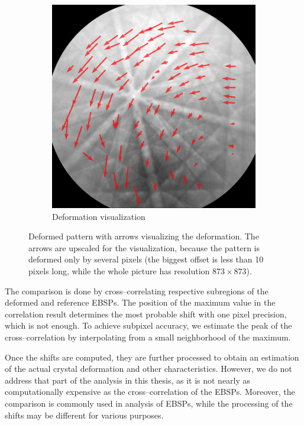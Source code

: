 \begin{figure}
\begin{subfigure}{.4\textwidth}
	\end{subfigure}
	\centering
	\begin{subfigure}{.4\textwidth}
		\centering
		\includegraphics[width=.9\linewidth]{img/roi_shifts}
		\caption{Deformation visualization}
		\label{roi-shifts:result}
	\end{subfigure}

	\caption{Deformed pattern with arrows visualizing the deformation. The arrows are upscaled for the visualization, because the pattern is deformed only by several pixels (the biggest offset is less than 10 pixels long, while the whole picture has resolution $873 \times 873$).}
	\label{roi-shifts}
\end{figure}

The comparison is done by cross--correlating respective subregions of the deformed and reference EBSPs. The position of the maximum value in the correlation result determines the most probable shift with one pixel precision, which is not enough. To achieve subpixel accuracy, we estimate the peak of the cross--correlation by interpolating from a small neighborhood of the maximum.

Once the shifts are computed, they are further processed to obtain an estimation of the actual crystal deformation and other characteristics. However, we do not address that part of the analysis in this thesis, as it is not nearly as computationally expensive as the cross--correlation of the EBSPs. Moreover, the comparison is commonly used in analysis of EBSPs, while the processing of the shifts may be different for various purposes.

